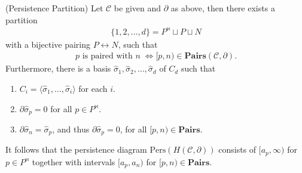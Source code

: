 \begin{theorem}
	{(Persistence Partition) \cite[\S 2.6]{de2011dualities}} \label{persistencepartition} Let $\mathcal{C}$ be given and $\partial$ as above, then there
	exists a partition
	\begin{align*}
		\{1,2, \ldots, d\} = P^{\Join} \sqcup P \sqcup N
	\end{align*}
	with a bijective pairing $P \leftrightarrow N$, such that
	\begin{align}
		p \text{ is paired with }n \; \iff [p,n) \in \textbf{Pairs}(\mathcal{C}, \partial).
	\end{align}
	Furthermore, there is a basis
	$\hat{\sigma}_{1}, \hat{\sigma}_{2}, \ldots, \hat{\sigma}_{d}$ of $C_{d}$ such
	that
	\begin{enumerate}
		\item $C_{i} = \langle \hat{\sigma}_{1}, \ldots, \hat{\sigma}_{i} \rangle$ for
			each $i$.

		\item $\partial\hat{\sigma}_{p} = 0$ for all $p \in P^{\Join}$.

		\item $\partial\hat{\sigma}_{n} = \hat{\sigma}_{p}$, and thus
			$\partial\hat{\sigma}_{p} = 0$, for all $[p,n) \in \textbf{Pairs}$.
	\end{enumerate}
	It follows that the persistence diagram
	$\mathrm{Pers}(H(\mathcal{C},\partial))$ consists of $[a_{p}, \infty)$ for
	$p \in P^{\Join}$ together with intervals $[a_{p},a_{n})$ for
	$[p,n) \in \textbf{Pairs}$.
\end{theorem}

